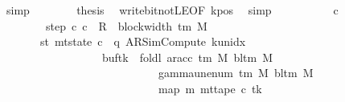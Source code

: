 \begin{isabellebody}
\ simp\isanewline
\ \ \ \ \ \ \isamarkupfalse%
\ {\isacharquery}{\kern0pt}thesis\ \isamarkupfalse%
\ write{\isacharunderscore}{\kern0pt}bit{\isacharunderscore}{\kern0pt}not{\isacharunderscore}{\kern0pt}LE{}{\isacharbrackleft}{\kern0pt}OF\ kpos{\isacharbrackright}{\kern0pt}\ \isamarkupfalse%
\ simp\isanewline
\ \ \ \ \isamarkupfalse%
\isanewline
\ \ \ \ \isamarkupfalse%
\ c{\isacharprime}{\kern0pt}{\isacharprime}{\kern0pt}\ \isanewline
\ \ \ \ \ \ \ \ step{\isacharcolon}{\kern0pt}\ {\isachardoublequoteopen}{\isacharparenleft}{\kern0pt}c{\isacharprime}{\kern0pt}{\isacharcomma}{\kern0pt}\ c{\isacharprime}{\kern0pt}{\isacharprime}{\kern0pt}{\isacharparenright}{\kern0pt}\ {\isasymin}\ R{\isacharprime}{\kern0pt}\ {\isacharcircum}{\kern0pt}{\isacharcircum}{\kern0pt}\ {\isacharparenleft}{\kern0pt}block{\isacharunderscore}{\kern0pt}width\ {\isacharparenleft}{\kern0pt}{\isasymGamma}{\isacharunderscore}{\kern0pt}tm\ M{\isacharparenright}{\kern0pt}\ {\isacharplus}{\kern0pt}\ {}{\isacharparenright}{\kern0pt}{\isachardoublequoteclose}\isanewline
\ \ \ \ \ \ \ st{\isacharcolon}{\kern0pt}\ {\isachardoublequoteopen}mt{\isacharunderscore}{\kern0pt}state\ c{\isacharprime}{\kern0pt}{\isacharprime}{\kern0pt}\ {\isacharequal}{\kern0pt}\ {\isacharparenleft}{\kern0pt}q{\isacharcomma}{\kern0pt}\ AR{\isacharunderscore}{\kern0pt}SimCompute{\isacharcomma}{\kern0pt}\ k{\isacharunderscore}{\kern0pt}unidx\ {}{\isacharcomma}{\kern0pt}\ {}{\isacharcomma}{\kern0pt}\isanewline
\ \ \ \ \ \ \ \ \ \ \ \ \ \ \ \ \ \ buf{\isacharparenleft}{\kern0pt}tk\ {\isacharcolon}{\kern0pt}{\isacharequal}{\kern0pt}\ foldl\ {\isacharparenleft}{\kern0pt}ar{\isacharunderscore}{\kern0pt}acc\ {\isacharparenleft}{\kern0pt}{\isasymGamma}{\isacharunderscore}{\kern0pt}tm\ M{\isacharparenright}{\kern0pt}\ {\isacharparenleft}{\kern0pt}bl{\isacharunderscore}{\kern0pt}tm\ M{\isacharparenright}{\kern0pt}{\isacharparenright}{\kern0pt}\isanewline
\ \ \ \ \ \ \ \ \ \ \ \ \ \ \ \ \ \ \ \ \ \ \ \ \ \ \ \ {\isacharparenleft}{\kern0pt}gamma{\isacharunderscore}{\kern0pt}unenum\ {\isacharparenleft}{\kern0pt}{\isasymGamma}{\isacharunderscore}{\kern0pt}tm\ M{\isacharparenright}{\kern0pt}\ {\isacharparenleft}{\kern0pt}bl{\isacharunderscore}{\kern0pt}tm\ M{\isacharparenright}{\kern0pt}\ {}{\isacharparenright}{\kern0pt}\isanewline
\ \ \ \ \ \ \ \ \ \ \ \ \ \ \ \ \ \ \ \ \ \ \ \ \ \ \ \ {\isacharparenleft}{\kern0pt}map\ {\isacharparenleft}{\kern0pt}{\isasymlambda}m{\isachardot}{\kern0pt}\ mt{\isacharunderscore}{\kern0pt}tape\ c{\isacharprime}{\kern0pt}\ tk\isanewline

\end{isabellebody}
